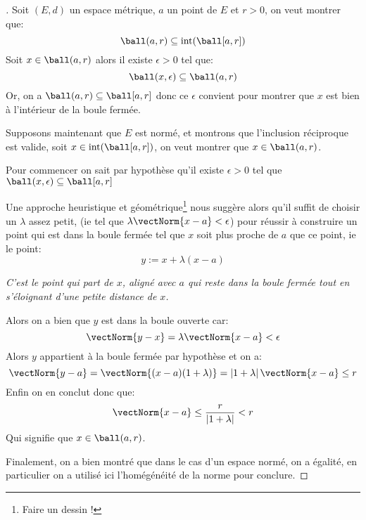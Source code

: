 \documentclass{report}
\begin{document}
      \subsection*{}
      \begin{proof}[\unskip\nopunct]
         Soit \((E, d)\) un espace métrique, \(a\) un point de \(E\) et \(r > 0\), on veut montrer que:
         \[
            \ball(a, r) \subseteq \text{int}(\ball[a, r])   
         \]
         Soit \(x \in \ball(a, r)\) alors il existe \(\epsilon > 0\) tel que:
         \[
            \ball(x, \epsilon) \subseteq \ball(a, r)   
         \]
         Or, on a \(\ball(a, r) \subseteq \ball[a, r]\) donc ce \(\epsilon\) convient pour montrer que \(x\) est bien à l'intérieur de la boule fermée.\<

         Supposons maintenant que \(E\) est normé, et montrons que l'inclusion réciproque est valide, soit \(x \in \text{int}(\ball[a, r])\), on veut montrer que \(x \in \ball(a, r)\). 
         
         Pour commencer on sait par hypothèse qu'il existe \(\epsilon > 0\) tel que \(\ball(x, \epsilon) \subseteq \ball[a, r]\)\<

         Une approche heuristique et géométrique\footnote[1]{Faire un dessin !} nous suggère alors qu'il suffit de choisir un \(\lambda\) assez petit, (ie tel que \(\lambda \vectNorm{x - a} < \epsilon\)) pour réussir à construire un point qui est dans la boule fermée tel que \(x\) soit plus proche de \(a\) que ce point, ie le point:
         \[
            y := x + \lambda(x - a) 
         \]
         \begin{center}
            \textit{C'est le point qui part de \(x\), aligné avec \(a\) qui reste dans la boule fermée tout en s'éloignant d'une petite distance de \(x\).}
         \end{center}
         Alors on a bien que \(y\) est dans la boule ouverte car:
         \[
            \vectNorm{y - x} =  \lambda \vectNorm{x - a} < \epsilon  
         \]
         Alors \(y\) appartient à la boule fermée par hypothèse et on a:
         \[
            \vectNorm{y - a} =  \vectNorm{(x - a)(1 + \lambda)} = \left| 1 + \lambda\right|\vectNorm{x - a} \leq r
         \]
         Enfin on en conclut donc que:
         \[
            \vectNorm{x - a} \leq \frac{r}{\left| 1 + \lambda\right|} < r
         \]
         Qui signifie que \(x \in \ball(a, r)\).\<

         Finalement, on a bien montré que dans le cas d'un espace normé, on a égalité, en particulier on a utilisé ici l'homégénéité de la norme pour conclure.
      \end{proof}
\end{document}
